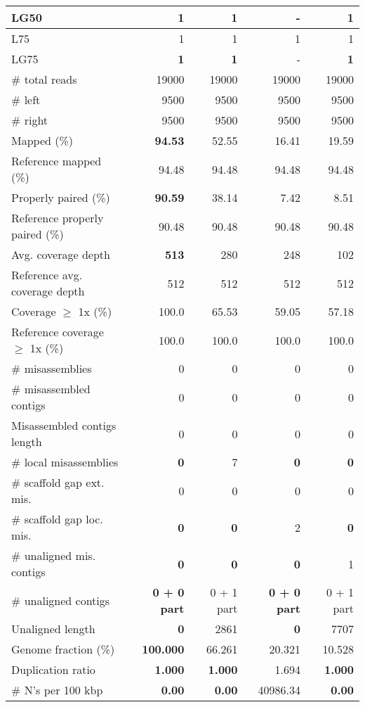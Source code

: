 \documentclass[12pt,a4paper]{article}
\begin{document}
\begin{table}[ht]
\begin{center}
\begin{tabular}{|l*{4}{|r}|}
LG50 & {\bf 1} & {\bf 1} & - & {\bf 1} \\ \hline
L75 & 1 & 1 & 1 & 1 \\ \hline
LG75 & {\bf 1} & {\bf 1} & - & {\bf 1} \\ \hline
\# total reads & 19000 & 19000 & 19000 & 19000 \\ \hline
\# left & 9500 & 9500 & 9500 & 9500 \\ \hline
\# right & 9500 & 9500 & 9500 & 9500 \\ \hline
Mapped (\%) & {\bf 94.53} & 52.55 & 16.41 & 19.59 \\ \hline
Reference mapped (\%) & 94.48 & 94.48 & 94.48 & 94.48 \\ \hline
Properly paired (\%) & {\bf 90.59} & 38.14 & 7.42 & 8.51 \\ \hline
Reference properly paired (\%) & 90.48 & 90.48 & 90.48 & 90.48 \\ \hline
Avg. coverage depth & {\bf 513} & 280 & 248 & 102 \\ \hline
Reference avg. coverage depth & 512 & 512 & 512 & 512 \\ \hline
Coverage $\geq$ 1x (\%) & 100.0 & 65.53 & 59.05 & 57.18 \\ \hline
Reference coverage $\geq$ 1x (\%) & 100.0 & 100.0 & 100.0 & 100.0 \\ \hline
\# misassemblies & 0 & 0 & 0 & 0 \\ \hline
\# misassembled contigs & 0 & 0 & 0 & 0 \\ \hline
Misassembled contigs length & 0 & 0 & 0 & 0 \\ \hline
\# local misassemblies & {\bf 0} & 7 & {\bf 0} & {\bf 0} \\ \hline
\# scaffold gap ext. mis. & 0 & 0 & 0 & 0 \\ \hline
\# scaffold gap loc. mis. & {\bf 0} & {\bf 0} & 2 & {\bf 0} \\ \hline
\# unaligned mis. contigs & {\bf 0} & {\bf 0} & {\bf 0} & 1 \\ \hline
\# unaligned contigs & {\bf 0 + 0 part} & 0 + 1 part & {\bf 0 + 0 part} & 0 + 1 part \\ \hline
Unaligned length & {\bf 0} & 2861 & {\bf 0} & 7707 \\ \hline
Genome fraction (\%) & {\bf 100.000} & 66.261 & 20.321 & 10.528 \\ \hline
Duplication ratio & {\bf 1.000} & {\bf 1.000} & 1.694 & {\bf 1.000} \\ \hline
\# N's per 100 kbp & {\bf 0.00} & {\bf 0.00} & 40986.34 & {\bf 0.00} \\ \hline

\end{tabular}
\end{center}
\end{table}
\end{document}
